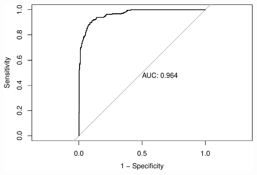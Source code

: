 \documentclass[]{article}
\begin{document}
\includegraphics{Logistic-LASSO_files/figure-latex/unnamed-chunk-25-1.pdf}
\end{document}
